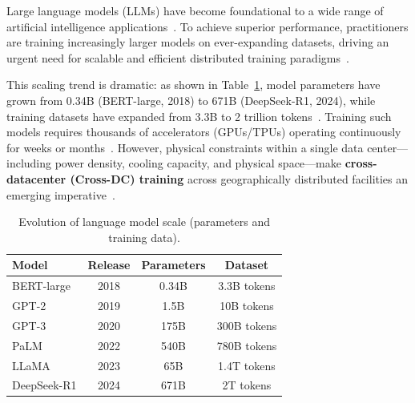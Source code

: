 Large language models (LLMs) have become foundational to a wide range of artificial intelligence applications~\cite{bommasani2021foundation, brown2020gpt3, touvron2023llama}. To achieve superior performance, practitioners are training increasingly larger models on ever-expanding datasets, driving an urgent need for scalable and efficient distributed training paradigms~\cite{narayanan2021efficient}.

This scaling trend is dramatic: as shown in Table~\ref{tab:llm-comparison}, model parameters have grown from 0.34B (BERT-large, 2018) to 671B (DeepSeek-R1, 2024), while training datasets have expanded from 3.3B to 2 trillion tokens~\cite{devlin2019bert, brown2020gpt3, chowdhery2022palm, touvron2023llama, deepseekai2025deepseekr1}. Training such models requires thousands of accelerators (GPUs/TPUs) operating continuously for weeks or months~\cite{shoeybi2019megatron, narayanan2021efficient}. However, physical constraints within a single data center—including power density, cooling capacity, and physical space—make \textbf{cross-datacenter (Cross-DC) training} across geographically distributed facilities an emerging imperative~\cite{yu2023cross}. 

\begin{table}[ht]
    \caption{Evolution of language model scale (parameters and training data).}
    \label{tab:llm-comparison}
    \centering
    \begin{tabular}{@{}lccc@{}}
        \toprule
        \textbf{Model} & \textbf{Release} & \textbf{Parameters} & \textbf{Dataset} \\
        \midrule
        BERT-large & 2018 & 0.34B & 3.3B tokens \\
        GPT-2 & 2019 & 1.5B & 10B tokens \\
        GPT-3 & 2020 & 175B & 300B tokens \\
        PaLM & 2022 & 540B & 780B tokens \\
        LLaMA & 2023 & 65B & 1.4T tokens \\
        DeepSeek-R1 & 2024 & 671B & 2T tokens \\
        \bottomrule
    \end{tabular}
\end{table}


